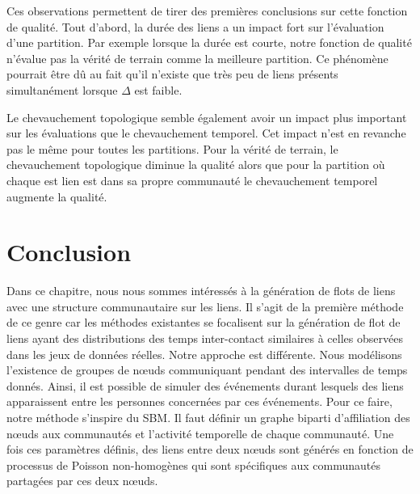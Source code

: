 Ces observations permettent de tirer des premières conclusions sur cette fonction de qualité.
Tout d'abord, la durée des liens a un impact fort sur l'évaluation d'une partition.
Par exemple lorsque la durée est courte, notre fonction de qualité n'évalue pas la vérité de terrain comme la meilleure partition.
Ce phénomène pourrait être dû au fait qu'il n'existe que très peu de liens présents simultanément lorsque $\Delta$ est faible.

Le chevauchement topologique semble également avoir un impact plus important sur les évaluations que le chevauchement temporel.
Cet impact n'est en revanche pas le même pour toutes les partitions.
Pour la vérité de terrain, le chevauchement topologique diminue la qualité alors que pour la partition où chaque est lien est dans sa propre communauté le chevauchement temporel augmente la qualité.


\section{Conclusion}

Dans ce chapitre, nous nous sommes intéressés à la génération de flots de liens avec une structure communautaire sur les liens.
Il s'agit de la première méthode de ce genre car les méthodes existantes se focalisent sur la génération de flot de liens ayant des distributions des temps inter-contact similaires à celles observées dans les jeux de données réelles.
Notre approche est différente.
Nous modélisons l'existence de groupes de n\oe{}uds communiquant pendant des intervalles de temps donnés.
Ainsi, il est possible de simuler des événements durant lesquels des liens apparaissent entre les personnes concernées par ces événements.
Pour ce faire, notre méthode s'inspire du SBM.
Il faut définir un graphe biparti d'affiliation des n\oe{}uds aux communautés et l'activité temporelle de chaque communauté.
Une fois ces paramètres définis, des liens entre deux n\oe{}uds sont générés en fonction de processus de Poisson non-homogènes qui sont spécifiques aux communautés partagées par ces deux n\oe{}uds.

